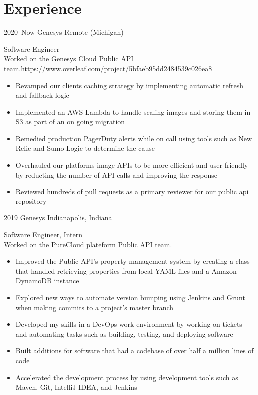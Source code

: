 \documentclass[]{cv-style}
\begin{document}
\section{Experience}
\begin{entrylist}
\entry
{2020--Now}
{Genesys}
{Remote (Michigan)}
{Software Engineer\\
Worked on the Genesys Cloud Public API team.https://www.overleaf.com/project/5bfaeb95dd2484539c026ea8
\begin{itemize}
    \item Revamped our clients caching strategy by implementing automatic refresh and fallback logic
    \item Implemented an AWS Lambda to handle scaling images and storing them in S3 as part of an on going migration
    \item Remedied production PagerDuty alerts while on call using tools such as New Relic and Sumo Logic to determine the cause
    \item Overhauled our platforms image APIs to be more efficient and user friendly by reducting the number of API calls and improving the response
    \item Reviewed hundreds of pull requests as a primary reviewer for our public api repository
\end{itemize}}
\entry
{2019}
{Genesys}
{Indianapolis, Indiana}
{Software Engineer, Intern\\
Worked on the PureCloud plateform Public API team.
\begin{itemize}
    \item Improved the Public API's property management system by creating a class that handled retrieving properties from local YAML files and a Amazon DynamoDB instance
    \item Explored new ways to automate version bumping using Jenkins and Grunt when making commits to a project's master branch
    \item Developed my skills in a DevOps work environment by working on tickets and automating tasks such as building, testing, and deploying software
    \item Built additions for software that had a codebase of over half a million lines of code
    \item Accelerated the development process by using development tools such as Maven, Git, IntelliJ IDEA, and Jenkins
\end{itemize}}

\end{entrylist}
\end{document}
